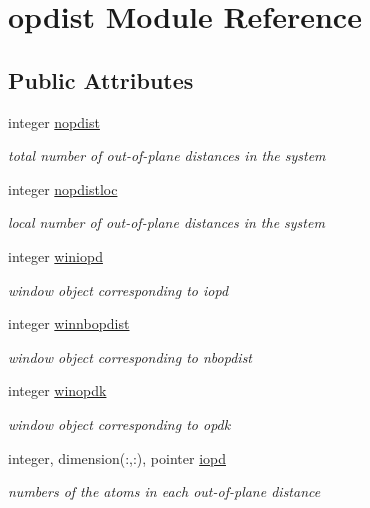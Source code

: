 \hypertarget{classopdist}{\section{opdist Module Reference}
\label{classopdist}
}
\subsection*{Public Attributes}
\begin{DoxyCompactItemize}
\item 
integer \hyperlink{classopdist_a4033a5b0a53e929560f7ad9f23b7ac88}{nopdist}
\begin{DoxyCompactList}\small\item\em total number of out-\/of-\/plane distances in the system \end{DoxyCompactList}\item 
integer \hyperlink{classopdist_a084f1a8d5999926a6dd842c0efb48a9c}{nopdistloc}
\begin{DoxyCompactList}\small\item\em local number of out-\/of-\/plane distances in the system \end{DoxyCompactList}\item 
integer \hyperlink{classopdist_a979e3c92d726c6792e0626f2472c31d7}{winiopd}
\begin{DoxyCompactList}\small\item\em window object corresponding to iopd \end{DoxyCompactList}\item 
integer \hyperlink{classopdist_a2c4d310dd914a5297cc50389a69f869f}{winnbopdist}
\begin{DoxyCompactList}\small\item\em window object corresponding to nbopdist \end{DoxyCompactList}\item 
integer \hyperlink{classopdist_a8aee101699cf64e1681ed6b24f75944b}{winopdk}
\begin{DoxyCompactList}\small\item\em window object corresponding to opdk \end{DoxyCompactList}\item 
integer, dimension(\-:,\-:), pointer \hyperlink{classopdist_ad959dbaed24d0e42ce8db3cc0b94d622}{iopd}
\begin{DoxyCompactList}\small\item\em numbers of the atoms in each out-\/of-\/plane distance \end{DoxyCompactList}\item 

\end{DoxyCompactItemize}
